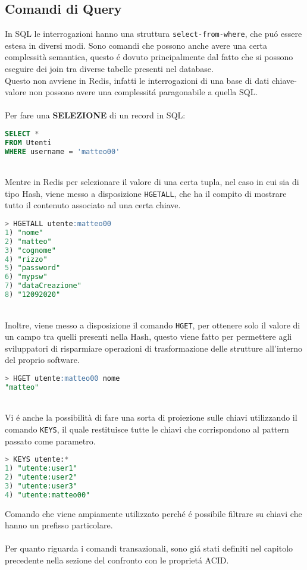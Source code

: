 \subsection{Comandi di Query}
In SQL le interrogazioni hanno una struttura \texttt{select-from-where}, che puó essere estesa in diversi modi. Sono comandi
che possono anche avere una certa complessità semantica, questo é dovuto principalmente dal fatto che si possono eseguire dei join
tra diverse tabelle presenti nel database.\\
Questo non avviene in Redis, infatti le interrogazioni di una base di dati chiave-valore non possono avere una complessitá paragonabile a quella SQL.\\
\\
Per fare una \textbf{SELEZIONE} di un record in SQL:
\begin{lstlisting}[autogobble,style=redis-cli, language=SQL]
SELECT *
FROM Utenti
WHERE username = 'matteo00'\end{lstlisting}
\\
Mentre in Redis per selezionare il valore di una certa tupla, nel caso in cui sia di tipo Hash, viene messo a disposizione \texttt{HGETALL}, che ha il compito di mostrare tutto
il contenuto associato ad una certa chiave.
\begin{lstlisting}[autogobble, style=redis-cli, language=SQL]
> HGETALL utente:matteo00
1) "nome"
2) "matteo"
3) "cognome"
4) "rizzo"
5) "password"
6) "mypsw"
7) "dataCreazione"
8) "12092020"
\end{lstlisting}
\\
Inoltre, viene messo a disposizione il comando \texttt{HGET}, per ottenere solo il valore di un campo tra quelli presenti nella Hash, questo viene fatto per permettere
agli sviluppatori di risparmiare operazioni di trasformazione delle strutture all'interno del proprio software.
\begin{lstlisting}[autogobble, style=redis-cli, language=SQL]
> HGET utente:matteo00 nome
"matteo"
\end{lstlisting}
\\
Vi é anche la possibilità di fare una sorta di proiezione sulle chiavi utilizzando il comando \texttt{KEYS}, il quale restituisce tutte le chiavi che corrispondono al pattern passato come parametro.
\begin{lstlisting}[autogobble, style=redis-cli, language=SQL]
> KEYS utente:*
1) "utente:user1"
2) "utente:user2"
3) "utente:user3"
4) "utente:matteo00"
\end{lstlisting}
Comando che viene ampiamente utilizzato perché é possibile filtrare su chiavi che hanno un prefisso particolare.\\
\\
Per quanto riguarda i comandi transazionali, sono giá stati definiti nel capitolo precedente nella sezione del confronto con le proprietá ACID.

